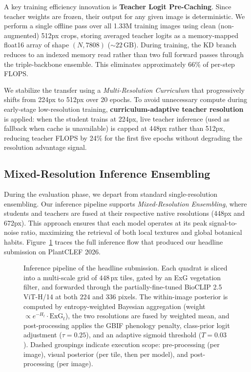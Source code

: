 \documentclass[10pt,twocolumn,letterpaper]{article}
\begin{document}
A key training efficiency innovation is \textbf{Teacher Logit Pre-Caching}. Since teacher weights are frozen, their output for any given image is deterministic. We perform a single offline pass over all 1.33M training images using clean (non-augmented) 512px crops, storing averaged teacher logits as a memory-mapped float16 array of shape $(N, 7808)$ (${\sim}22$\,GB). During training, the KD branch reduces to an indexed memory read rather than two full forward passes through the triple-backbone ensemble. This eliminates approximately 66\% of per-step FLOPS.

We stabilize the transfer using a \textit{Multi-Resolution Curriculum} that progressively shifts from 224px to 512px over 20 epochs. To avoid unnecessary compute during early-stage low-resolution training, \textbf{curriculum-adaptive teacher resolution} is applied: when the student trains at 224px, live teacher inference (used as fallback when cache is unavailable) is capped at 448px rather than 512px, reducing teacher FLOPS by 24\% for the first five epochs without degrading the resolution advantage signal.

\subsection{Mixed-Resolution Inference Ensembling}
During the evaluation phase, we depart from standard single-resolution ensembling. Our inference pipeline supports \textit{Mixed-Resolution Ensembling}, where students and teachers are fused at their respective native resolutions (448px and 672px). This approach ensures that each model operates at its peak signal-to-noise ratio, maximizing the retrieval of both local textures and global botanical habits. Figure~\ref{fig:pipeline} traces the full inference flow that produced our headline submission on PlantCLEF 2026.

\begin{figure}[t]
  \centering
  \resizebox{0.95\linewidth}{!}{}
  \caption{Inference pipeline of the headline submission. Each quadrat is sliced into a multi-scale grid of $448$\,px tiles, gated by an ExG vegetation filter, and forwarded through the partially-fine-tuned BioCLIP 2.5 ViT-H/14 at both $224$ and $336$ pixels. The within-image posterior is computed by entropy-weighted Bayesian aggregation (weight $\propto e^{-H_t}\cdot\mathrm{ExG}_t$), the two resolutions are fused by weighted mean, and post-processing applies the GBIF phenology penalty, class-prior logit adjustment ($\tau{=}0.25$), and an adaptive sigmoid threshold ($T{=}0.03$). Dashed groupings indicate execution scope: pre-processing (per image), visual posterior (per tile, then per model), and post-processing (per image).}
  \label{fig:pipeline}
\end{figure}
\end{document}
